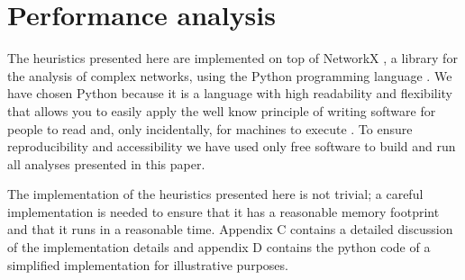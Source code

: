 \section{Performance analysis}
\label{performance}

The heuristics presented here are implemented on top of NetworkX \citep{hagberg:2008}, a library for the analysis of complex networks, using the Python programming language \citep{vanrossum:1995}. We have chosen Python because it is a language with high readability and flexibility that allows you to easily apply the well know principle of writing software for people to read and, only incidentally, for machines to execute \citep{abelson:1985}. To ensure reproducibility and accessibility we have used only free software to build and run all analyses presented in this paper. 

The implementation of the heuristics presented here is not trivial; a careful implementation is needed to ensure that it has a reasonable memory footprint and that it runs in a reasonable time. Appendix C contains a detailed discussion of the implementation details and appendix D contains the python code of a simplified implementation for illustrative purposes.

